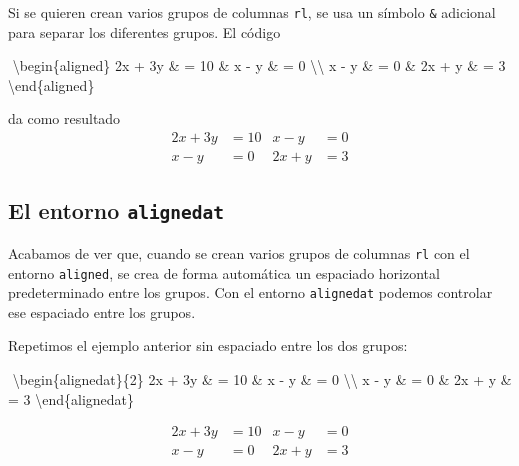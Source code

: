 \documentclass[
  letterpaper,
  DIV=11,
  numbers=noendperiod]{scrartcl}
\newenvironment{Shaded}{\begin{snugshade}}{\end{snugshade}}
\newcommand{\ExtensionTok}[1]{\textcolor[rgb]{0.00,0.23,0.31}{#1}}
\newcommand{\KeywordTok}[1]{\textcolor[rgb]{0.00,0.23,0.31}{#1}}
\newcommand{\NormalTok}[1]{\textcolor[rgb]{0.00,0.23,0.31}{#1}}
\newcommand{\SpecialCharTok}[1]{\textcolor[rgb]{0.37,0.37,0.37}{#1}}
\newcommand{\SpecialStringTok}[1]{\textcolor[rgb]{0.13,0.47,0.30}{#1}}
\begin{document}
Si se quieren crean varios grupos de columnas \texttt{rl}, se usa un
símbolo \texttt{\&} adicional para separar los diferentes grupos. El
código

\begin{Shaded}
\begin{Highlighting}[]
\SpecialStringTok{$$}
\KeywordTok{\textbackslash{}begin}\NormalTok{\{}\ExtensionTok{aligned}\NormalTok{\}}\SpecialStringTok{ }
\SpecialStringTok{2x + 3y \& = 10   \&    x {-} y \& = 0 }\SpecialCharTok{\textbackslash{}\textbackslash{}}
\SpecialStringTok{  x {-} y \& = 0    \&   2x + y \& = 3}
\KeywordTok{\textbackslash{}end}\NormalTok{\{}\ExtensionTok{aligned}\NormalTok{\}}
\SpecialStringTok{$$}
\end{Highlighting}
\end{Shaded}

da como resultado \[
\begin{aligned} 
2x + 3y & = 10   &    x - y & = 0 \\
  x - y & = 0    &   2x + y & = 3
\end{aligned}
\]

\hypertarget{el-entorno-alignedat}{%
\subsection{\texorpdfstring{El entorno
\texttt{alignedat}}{El entorno alignedat}}\label{el-entorno-alignedat}}

Acabamos de ver que, cuando se crean varios grupos de columnas
\texttt{rl} con el entorno \texttt{aligned}, se crea de forma automática
un espaciado horizontal predeterminado entre los grupos. Con el entorno
\texttt{alignedat} podemos controlar ese espaciado entre los grupos.

Repetimos el ejemplo anterior sin espaciado entre los dos grupos:

\begin{Shaded}
\begin{Highlighting}[]
\SpecialStringTok{$$}
\KeywordTok{\textbackslash{}begin}\NormalTok{\{}\ExtensionTok{alignedat}\NormalTok{\}}\SpecialStringTok{\{2\} }
\SpecialStringTok{2x + 3y  \& = 10   \&    x {-} y \& = 0 }\SpecialCharTok{\textbackslash{}\textbackslash{}}
\SpecialStringTok{  x {-} y  \& = 0    \&   2x + y \& = 3}
\KeywordTok{\textbackslash{}end}\NormalTok{\{}\ExtensionTok{alignedat}\NormalTok{\}}
\SpecialStringTok{$$}
\end{Highlighting}
\end{Shaded}

\[
\begin{alignedat}{2} 
2x + 3y  & = 10   &    x - y & = 0 \\
  x - y  & = 0    &   2x + y & = 3
\end{alignedat}
\]
\end{document}
